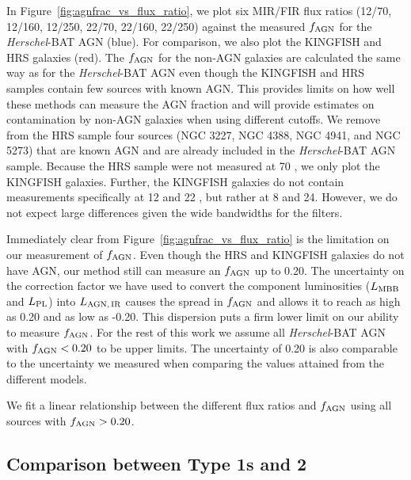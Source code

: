 \documentclass[fleqn, usenatbib]{mnras}
\newcommand{\herschel}{\emph{Herschel}}
\begin{document}
In Figure~\ref{fig:agnfrac_vs_flux_ratio}, we plot six MIR/FIR flux ratios (12/70, 12/160, 12/250, 22/70, 22/160, 22/250) against the measured $f_{\rm AGN}$ for the \herschel-BAT AGN (blue). For comparison, we also plot the KINGFISH and HRS galaxies (red). The $f_{\rm AGN}$ for the non-AGN galaxies are calculated the same way as for the \herschel-BAT AGN even though the KINGFISH and HRS samples contain few sources with known AGN. This provides limits on how well these methods can measure the AGN fraction and will provide estimates on contamination by non-AGN galaxies when using different cutoffs. We remove from the HRS sample four sources (NGC 3227, NGC 4388, NGC 4941, and NGC 5273) that are known AGN and are already included in the \herschel-BAT AGN sample. Because the HRS sample were not measured at 70 \micron, we only plot the KINGFISH galaxies. Further, the KINGFISH galaxies do not contain measurements specifically at 12 and 22 \micron, but rather at 8 and 24. However, we do not expect large differences given the wide bandwidths for the filters. 

Immediately clear from Figure~\ref{fig:agnfrac_vs_flux_ratio} is the limitation on our measurement of $f_{\rm AGN}$. Even though the HRS and KINGFISH galaxies do not have AGN, our method still can measure an $f_{\rm AGN}$ up to 0.20.  The uncertainty on the correction factor we have used to convert the component luminosities ($L_{\rm MBB}$ and $L_{\rm PL}$) into $L_{\rm AGN,\,IR}$ causes the spread in $f_{\rm AGN}$ and allows it to reach as high as 0.20 and as low as -0.20. This dispersion puts a firm lower limit on our ability to measure $f_{\rm AGN}$. For the rest of this work we assume all \herschel-BAT AGN with $f_{\rm AGN} < 0.20$ to be upper limits. The uncertainty of 0.20 is also comparable to the uncertainty we measured when comparing the values attained from the different models.

We fit a linear relationship between the different flux ratios and $f_{\rm AGN}$ using all sources with $f_{\rm AGN} > 0.20$. 


\subsection{Comparison between Type 1s and 2}
\end{document}
